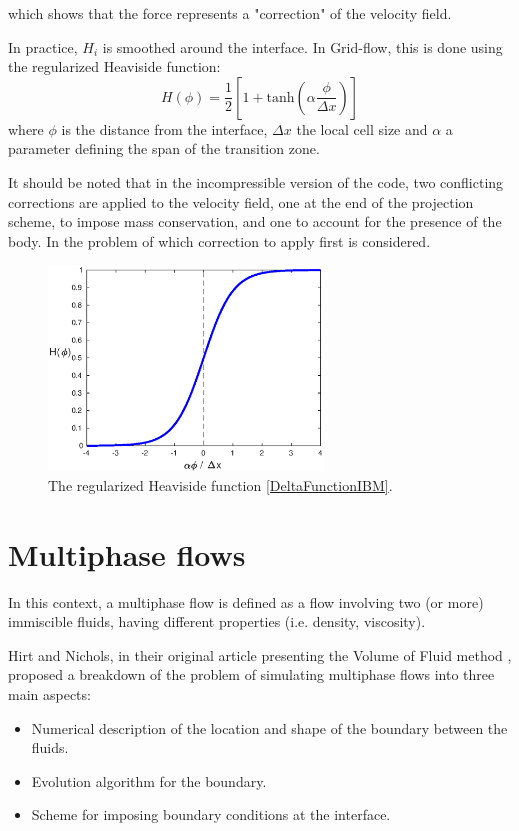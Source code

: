 \documentclass[11pt, a4paper, oneside, openany]{book}
\begin{document}
which shows that the force represents a "correction" of the velocity field.\par 
In practice, $H_{i}$ is smoothed around the interface. In Grid-flow, this is done using the regularized Heaviside function:
\begin{equation*}
H\left(\phi\right)=\dfrac{1}{2}\left[1+\mathrm{tanh}\left(\alpha\dfrac{\phi}{\Delta x}\right)\right]\label{DeltaFunctionIBM}
\end{equation*}
where $\phi$ is the distance from the interface, $\Delta x$ the local cell size and $\alpha$ a parameter defining the span of the transition zone.\par
It should be noted that in the incompressible version of the code, two conflicting corrections are applied to the velocity field, one at the end of the projection scheme, to impose mass conservation, and one to account for the presence of the body. In \cite{Vittoz2018} the problem of which correction to apply first is considered.  
\begin{figure}[!ht]
	\centering
	\includegraphics[width=0.65\textwidth]{Heaviside.eps}
	\caption[Regularized Heaviside function]{The regularized Heaviside function \eqref{DeltaFunctionIBM}.}
	\label{Heaviside}
\end{figure}\noindent
\chapter{Multiphase flows}\label{Chapter_Multiphase_Flows}
In this context, a multiphase flow is defined as a flow involving two (or more) immiscible fluids, having different properties (i.e. density, viscosity).\par
Hirt and Nichols, in their original article presenting the Volume of Fluid method \cite{hirt1981volume}, proposed a breakdown of the problem of simulating multiphase flows into three main aspects:
\begin{itemize}
\item Numerical description of the location and shape of the boundary between the fluids.
\item Evolution algorithm for the boundary.
\item Scheme for imposing boundary conditions at the interface.
\end{itemize}
\end{document}
